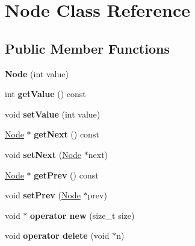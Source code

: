 \hypertarget{class_node}{}\section{Node Class Reference}
\label{class_node}
\subsection*{Public Member Functions}
\begin{DoxyCompactItemize}
\item 
\mbox{\label{class_node_a2c5fe4ecef1aa9623d740582b1425c16}} 
{\bfseries Node} (int value)
\item 
\mbox{\label{class_node_adff3a518bee178e1b53cc4a945a2a9e9}} 
int {\bfseries get\+Value} () const
\item 
\mbox{\label{class_node_a9e337c1790152faf945a87207d7e1125}} 
void {\bfseries set\+Value} (int value)
\item 
\mbox{\label{class_node_a7207ac6b9786567730715f0d2a230764}} 
\mbox{\hyperlink{class_node}{Node}} $\ast$ {\bfseries get\+Next} () const
\item 
\mbox{\label{class_node_ae0062432733265c491000494625c3a04}} 
void {\bfseries set\+Next} (\mbox{\hyperlink{class_node}{Node}} $\ast$next)
\item 
\mbox{\label{class_node_af3a5d9a808825f8fb5c3cbe1d51abe68}} 
\mbox{\hyperlink{class_node}{Node}} $\ast$ {\bfseries get\+Prev} () const
\item 
\mbox{\label{class_node_a169576a90ab0bd0706491c445616c909}} 
void {\bfseries set\+Prev} (\mbox{\hyperlink{class_node}{Node}} $\ast$prev)
\item 
\mbox{\label{class_node_ad93f4bb54e5f2759c8f903fd2d740267}} 
void $\ast$ {\bfseries operator new} (size\+\_\+t size)
\item 
\mbox{\label{class_node_a557ce5967390ff6264c69b585e24a396}} 
void {\bfseries operator delete} (void $\ast$n)
\end{DoxyCompactItemize}
